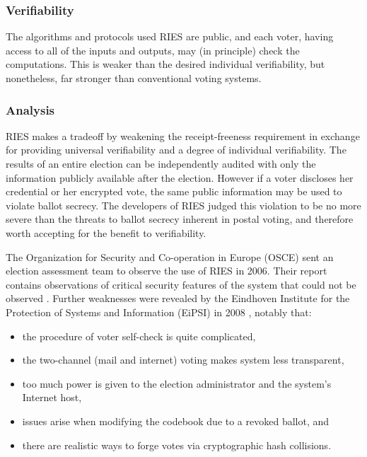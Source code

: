 \subsubsection{Verifiability}

The algorithms and protocols used RIES are public, and each voter,
having access to all of the inputs and outputs, may (in principle)
check the computations. This is weaker than the desired individual
verifiability, but nonetheless, far stronger than
conventional voting systems.

\subsubsection{Analysis}

RIES makes a tradeoff by weakening the receipt-freeness requirement in
exchange for providing universal verifiability and a degree of
individual verifiability. The results of an entire election can be
independently audited with only the information publicly available
after the election. However if a voter discloses her credential or her
encrypted vote, the same public information may be used to violate
ballot secrecy. The developers of RIES judged this violation to be no
more severe than the threats to ballot secrecy inherent in postal
voting, and therefore worth accepting for the benefit to
verifiability.

The Organization for Security and Co-operation in Europe (OSCE) sent
an election assessment team to observe the use of RIES in 2006. Their
report contains observations of critical security features of the
system that could not be observed \cite{osce2007}. Further
weaknesses were revealed by the Eindhoven Institute for the Protection
of Systems and Information (EiPSI) in 2008 \cite{hubbers2008},
notably that:

\begin{itemize}
  \item the procedure of voter self-check is quite complicated,
  \item the two-channel (mail and internet) voting makes system less
    transparent,
  \item too much power is given to the election administrator and the
    system's Internet host,
  \item issues arise when modifying the codebook due to a revoked
    ballot, and
  \item there are realistic ways to forge votes via cryptographic hash
    collisions.
\end{itemize}

